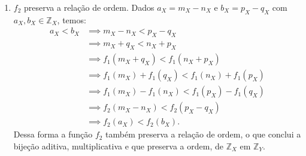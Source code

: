 \documentclass[../main.tex]{subfiles}
\begin{document}
\begin{dem}
\begin{enumerate}
\begin{enumerate}
            \item $f_2$ preserva a relação de ordem. Dados $a_X = m_X - n_X$ e $b_X = p_X - q_X$ com $a_X, b_X \in \mathbb{Z}_X$, temos:
            \begin{align*}
                a_X < b_X &\implies m_X - n_X < p_X - q_X \\
                &\implies m_X + q_X < n_X + p_X \\
                &\implies f_1(m_X+q_X) < f_1(n_X+p_X) \\
                &\implies f_1(m_X) + f_1(q_X) < f_1(n_X) + f_1(p_X) \\
                &\implies f_1(m_X) -f_1(n_X) < f_1(p_X) - f_1(q_X) \\
                &\implies f_2(m_X-n_X) < f_2(p_X-q_X) \\
                &\implies f_2(a_X) < f_2(b_X).
            \end{align*}
            Dessa forma a função $f_2$ também preserva a relação de ordem, o que conclui a bijeção aditiva, multiplicativa e que preserva a ordem, de $\mathbb{Z}_X$ em $\mathbb{Z}_Y$.
        \end{enumerate}
    
    

\end{enumerate}
\end{dem}
\end{document}
